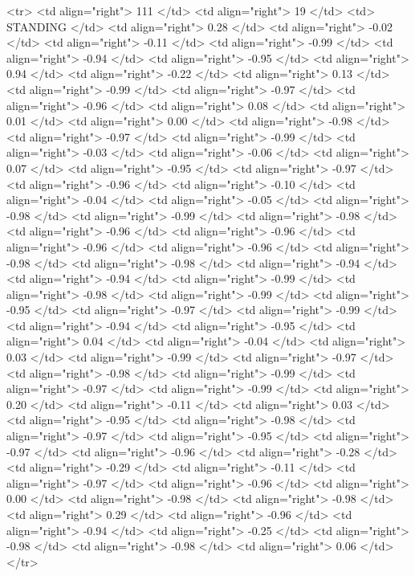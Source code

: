   <tr> <td align="right"> 111 </td> <td align="right">  19 </td> <td> STANDING </td> <td align="right"> 0.28 </td> <td align="right"> -0.02 </td> <td align="right"> -0.11 </td> <td align="right"> -0.99 </td> <td align="right"> -0.94 </td> <td align="right"> -0.95 </td> <td align="right"> 0.94 </td> <td align="right"> -0.22 </td> <td align="right"> 0.13 </td> <td align="right"> -0.99 </td> <td align="right"> -0.97 </td> <td align="right"> -0.96 </td> <td align="right"> 0.08 </td> <td align="right"> 0.01 </td> <td align="right"> 0.00 </td> <td align="right"> -0.98 </td> <td align="right"> -0.97 </td> <td align="right"> -0.99 </td> <td align="right"> -0.03 </td> <td align="right"> -0.06 </td> <td align="right"> 0.07 </td> <td align="right"> -0.95 </td> <td align="right"> -0.97 </td> <td align="right"> -0.96 </td> <td align="right"> -0.10 </td> <td align="right"> -0.04 </td> <td align="right"> -0.05 </td> <td align="right"> -0.98 </td> <td align="right"> -0.99 </td> <td align="right"> -0.98 </td> <td align="right"> -0.96 </td> <td align="right"> -0.96 </td> <td align="right"> -0.96 </td> <td align="right"> -0.96 </td> <td align="right"> -0.98 </td> <td align="right"> -0.98 </td> <td align="right"> -0.94 </td> <td align="right"> -0.94 </td> <td align="right"> -0.99 </td> <td align="right"> -0.98 </td> <td align="right"> -0.99 </td> <td align="right"> -0.95 </td> <td align="right"> -0.97 </td> <td align="right"> -0.99 </td> <td align="right"> -0.94 </td> <td align="right"> -0.95 </td> <td align="right"> 0.04 </td> <td align="right"> -0.04 </td> <td align="right"> 0.03 </td> <td align="right"> -0.99 </td> <td align="right"> -0.97 </td> <td align="right"> -0.98 </td> <td align="right"> -0.99 </td> <td align="right"> -0.97 </td> <td align="right"> -0.99 </td> <td align="right"> 0.20 </td> <td align="right"> -0.11 </td> <td align="right"> 0.03 </td> <td align="right"> -0.95 </td> <td align="right"> -0.98 </td> <td align="right"> -0.97 </td> <td align="right"> -0.95 </td> <td align="right"> -0.97 </td> <td align="right"> -0.96 </td> <td align="right"> -0.28 </td> <td align="right"> -0.29 </td> <td align="right"> -0.11 </td> <td align="right"> -0.97 </td> <td align="right"> -0.96 </td> <td align="right"> 0.00 </td> <td align="right"> -0.98 </td> <td align="right"> -0.98 </td> <td align="right"> 0.29 </td> <td align="right"> -0.96 </td> <td align="right"> -0.94 </td> <td align="right"> -0.25 </td> <td align="right"> -0.98 </td> <td align="right"> -0.98 </td> <td align="right"> 0.06 </td> </tr>
